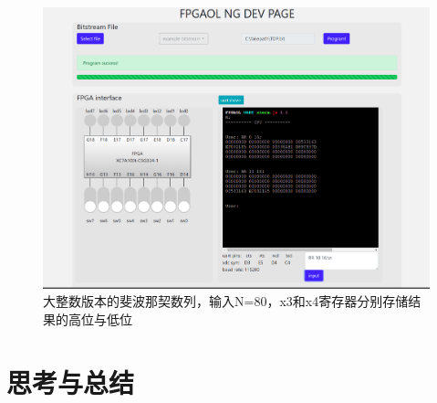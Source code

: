 \documentclass[12pt,a4paper]{ctexart}
\begin{document}
\begin{figure}[H]
    \centering
    \includegraphics[scale=0.5]{pic/f.png}
    \caption{大整数版本的斐波那契数列，输入N=80，x3和x4寄存器分别存储结果的高位与低位}
\end{figure}
\section{思考与总结}
\end{document}
